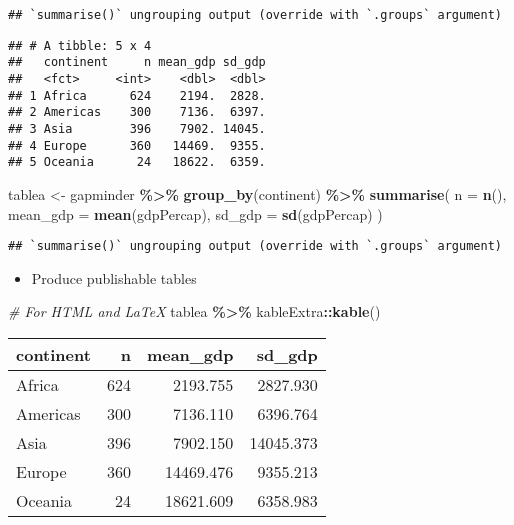 \documentclass[
]{book}
\newenvironment{Shaded}{\begin{snugshade}}{\end{snugshade}}
\newcommand{\CommentTok}[1]{\textcolor[rgb]{0.56,0.35,0.01}{\textit{#1}}}
\newcommand{\DataTypeTok}[1]{\textcolor[rgb]{0.13,0.29,0.53}{#1}}
\newcommand{\KeywordTok}[1]{\textcolor[rgb]{0.13,0.29,0.53}{\textbf{#1}}}
\newcommand{\NormalTok}[1]{#1}
\newcommand{\OperatorTok}[1]{\textcolor[rgb]{0.81,0.36,0.00}{\textbf{#1}}}
\newcommand{\StringTok}[1]{\textcolor[rgb]{0.31,0.60,0.02}{#1}}
\providecommand{\tightlist}{%
  \setlength{\itemsep}{0pt}\setlength{\parskip}{0pt}}
\begin{document}
\begin{verbatim}
## `summarise()` ungrouping output (override with `.groups` argument)
\end{verbatim}

\begin{verbatim}
## # A tibble: 5 x 4
##   continent     n mean_gdp sd_gdp
##   <fct>     <int>    <dbl>  <dbl>
## 1 Africa      624    2194.  2828.
## 2 Americas    300    7136.  6397.
## 3 Asia        396    7902. 14045.
## 4 Europe      360   14469.  9355.
## 5 Oceania      24   18622.  6359.
\end{verbatim}

\begin{Shaded}
\begin{Highlighting}[]
\NormalTok{tablea \textless{}{-}}\StringTok{ }\NormalTok{gapminder }\OperatorTok{\%\textgreater{}\%}
\StringTok{  }\KeywordTok{group\_by}\NormalTok{(continent) }\OperatorTok{\%\textgreater{}\%}
\StringTok{  }\KeywordTok{summarise}\NormalTok{(}
    \DataTypeTok{n =} \KeywordTok{n}\NormalTok{(),}
    \DataTypeTok{mean\_gdp =} \KeywordTok{mean}\NormalTok{(gdpPercap),}
    \DataTypeTok{sd\_gdp =} \KeywordTok{sd}\NormalTok{(gdpPercap)}
\NormalTok{  )}
\end{Highlighting}
\end{Shaded}

\begin{verbatim}
## `summarise()` ungrouping output (override with `.groups` argument)
\end{verbatim}

\begin{itemize}
\tightlist
\item
  Produce publishable tables
\end{itemize}

\begin{Shaded}
\begin{Highlighting}[]
\CommentTok{\# For HTML and LaTeX}
\NormalTok{tablea }\OperatorTok{\%\textgreater{}\%}\StringTok{ }\NormalTok{kableExtra}\OperatorTok{::}\KeywordTok{kable}\NormalTok{()}
\end{Highlighting}
\end{Shaded}

\begin{tabular}{l|r|r|r}
\hline
continent & n & mean\_gdp & sd\_gdp\\
\hline
Africa & 624 & 2193.755 & 2827.930\\
\hline
Americas & 300 & 7136.110 & 6396.764\\
\hline
Asia & 396 & 7902.150 & 14045.373\\
\hline
Europe & 360 & 14469.476 & 9355.213\\
\hline
Oceania & 24 & 18621.609 & 6358.983\\
\hline
\end{tabular}
\end{document}
